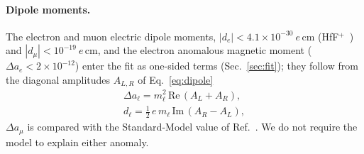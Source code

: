 \documentclass[twocolumn,epjc3]{svjour3}
\begin{document}
\paragraph{Dipole moments.} The electron and muon electric dipole moments, $|d_e|<4.1\times10^{-30}~e\,\mathrm{cm}$ (HfF$^+$~\cite{Roussy:2022cmp}) and $|d_\mu|<10^{-19}~e\,\mathrm{cm}$, and the electron anomalous magnetic moment ($\Delta a_e<2\times10^{-12}$) enter the fit as one-sided terms (Sec.~\ref{sec:fit}); they follow from the diagonal amplitudes $A_{L,R}$ of Eq.~\eqref{eq:dipole}
\begin{equation}
\begin{gathered}\Delta a_\ell=m_\ell^2\,\mathrm{Re}\,(A_L+A_R),\\ d_\ell=\tfrac12\,e\,m_\ell\,\mathrm{Im}\,(A_R-A_L),\end{gathered}
\end{equation} $\Delta a_\mu$ is compared with the Standard-Model value of Ref.~\cite{Aliberti:2025beg}. We do not require the model to explain either anomaly.
\end{document}
